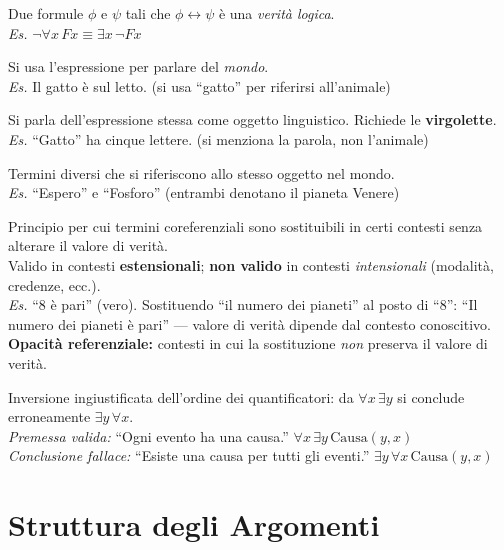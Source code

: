 \documentclass[10pt,a4paper]{article}
\begin{document}
{Due formule $\phi$ e $\psi$ tali che $\phi \leftrightarrow \psi$ è una \emph{verità logica}.\\
\textit{Es.} $\lnot\forall x\,Fx \equiv \exists x\,\lnot Fx$}

{Si usa l'espressione per parlare del \emph{mondo}.\\
\textit{Es.} Il gatto è sul letto. \quad (si usa ``gatto'' per riferirsi all'animale)}

{Si parla dell'espressione stessa come oggetto linguistico. Richiede le \textbf{virgolette}.\\
\textit{Es.} ``Gatto'' ha cinque lettere. \quad (si menziona la parola, non l'animale)}

{Termini diversi che si riferiscono allo stesso oggetto nel mondo.\\
\textit{Es.} ``Espero'' e ``Fosforo'' (entrambi denotano il pianeta Venere)}

{Principio per cui termini coreferenziali sono sostituibili in certi contesti senza alterare il valore di verità.\\
Valido in contesti \textbf{estensionali}; \textbf{non valido} in contesti \emph{intensionali} (modalità, credenze, ecc.).\\
\textit{Es.} ``8 è pari'' (vero). Sostituendo ``il numero dei pianeti'' al posto di ``8'':
``Il numero dei pianeti è pari'' --- valore di verità dipende dal contesto conoscitivo.\\
\textbf{Opacità referenziale:} contesti in cui la sostituzione \emph{non} preserva il valore di verità.}

{Inversione ingiustificata dell'ordine dei quantificatori: da $\forall x\,\exists y$ si conclude erroneamente $\exists y\,\forall x$.\\
\textit{Premessa valida:} ``Ogni evento ha una causa.'' \; $\forall x\,\exists y\,\text{Causa}(y,x)$\\
\textit{Conclusione fallace:} ``Esiste una causa per tutti gli eventi.'' \; $\exists y\,\forall x\,\text{Causa}(y,x)$}



\newpage
\section{Struttura degli Argomenti}
\end{document}
